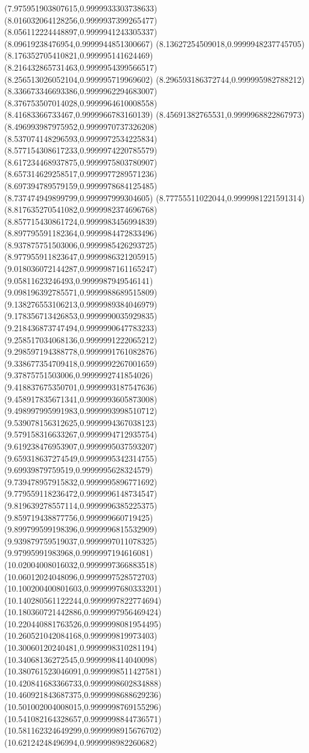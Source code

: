 {(7.975951903807615,0.9999933303738633)
(8.016032064128256,0.9999937399265477)
(8.056112224448897,0.9999941243305337)
(8.09619238476954,0.9999944851300667)
(8.13627254509018,0.9999948237745705)
(8.176352705410821,0.999995141624469)
(8.216432865731463,0.9999954399566517)
(8.256513026052104,0.999995719969602)
(8.296593186372744,0.999995982788212)
(8.336673346693386,0.9999962294683007)
(8.376753507014028,0.9999964610008558)
(8.41683366733467,0.9999966783160139)
(8.45691382765531,0.9999968822867973)
(8.496993987975952,0.9999970737326208)
(8.537074148296593,0.9999972534225834)
(8.577154308617233,0.9999974220785579)
(8.617234468937875,0.9999975803780907)
(8.657314629258517,0.9999977289571236)
(8.697394789579159,0.9999978684125485)
(8.737474949899799,0.999997999304605)
(8.77755511022044,0.9999981221591314)
(8.817635270541082,0.9999982374696768)
(8.857715430861724,0.9999983456994839)
(8.897795591182364,0.9999984472833496)
(8.937875751503006,0.9999985426293725)
(8.977955911823647,0.9999986321205915)
(9.018036072144287,0.9999987161165247)
(9.05811623246493,0.9999987949546141)
(9.098196392785571,0.9999988689515809)
(9.138276553106213,0.9999989384046979)
(9.178356713426853,0.9999990035929835)
(9.218436873747494,0.9999990647783233)
(9.258517034068136,0.9999991222065212)
(9.298597194388778,0.9999991761082876)
(9.338677354709418,0.9999992267001659)
(9.37875751503006,0.9999992741854026)
(9.418837675350701,0.9999993187547636)
(9.458917835671341,0.9999993605873008)
(9.498997995991983,0.9999993998510712)
(9.539078156312625,0.9999994367038123)
(9.579158316633267,0.9999994712935754)
(9.619238476953907,0.9999995037593207)
(9.659318637274549,0.9999995342314755)
(9.69939879759519,0.9999995628324579)
(9.739478957915832,0.9999995896771692)
(9.779559118236472,0.9999996148734547)
(9.819639278557114,0.9999996385225375)
(9.859719438877756,0.999999660719425)
(9.899799599198396,0.9999996815532909)
(9.939879759519037,0.9999997011078325)
(9.97995991983968,0.9999997194616081)
(10.02004008016032,0.9999997366883518)
(10.06012024048096,0.9999997528572703)
(10.100200400801603,0.9999997680333201)
(10.140280561122244,0.9999997822774694)
(10.180360721442886,0.9999997956469424)
(10.220440881763526,0.9999998081954495)
(10.260521042084168,0.999999819973403)
(10.30060120240481,0.9999998310281194)
(10.34068136272545,0.9999998414040098)
(10.380761523046091,0.9999998511427581)
(10.420841683366733,0.9999998602834888)
(10.460921843687375,0.9999998688629236)
(10.501002004008015,0.9999998769155296)
(10.541082164328657,0.9999998844736571)
(10.581162324649299,0.9999998915676702)
(10.62124248496994,0.9999998982260682)
}
